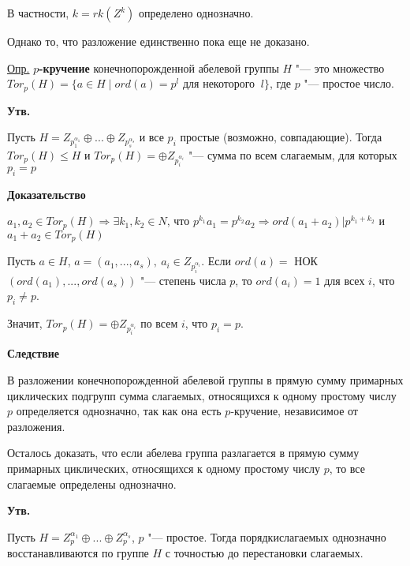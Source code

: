\documentclass{article}
\begin{document}
В частности, $k = rk(Z^k)$ определено однозначно.

Однако то, что разложение единственно пока еще не доказано.

\vspace{5pt}

\underline{Опр.} \textbf{$p$-кручение} конечнопорожденной абелевой группы $H$ "--- это множество $Tor_p(H) = \{a \in H \mid ord(a) = p^l$ для некоторого $\ l\}$, где $p$ "--- простое число.

\vspace{5pt}

\textbf{Утв.}

Пусть $H = Z_{p_1^{\alpha_1}} \oplus ... \oplus Z_{p_s^{\alpha_s}}$ и все $p_i$ простые (возможно, совпадающие). Тогда $Tor_p(H) \leq H$ и $Tor_p(H) = \oplus Z_{p_i^{\alpha_i}}$ "--- сумма по всем слагаемым, для которых $p_i = p$

\vspace{5pt}

\textbf{Доказательство}

$a_1, a_2 \in Tor_p(H) \Rightarrow \exists k_1, k_2 \in N$, что $p^{k_1}a_1 = p^{k_2}a_2 \Rightarrow ord(a_1 + a_2) | p^{k_1 + k_2}$ и $a_1 + a_2 \in Tor_p(H)$

Пусть $a \in H$, $a = (a_1, ..., a_s),\ a_i \in 	Z_{p_i^{\alpha_i}}$. Если $ord(a) = $ НОК$(ord(a_1), ..., ord(a_s))$ "--- степень числа $p$, то $ord(a_i) = 1$ для всех $i$, что $p_i \neq p$.

Значит, $Tor_p(H) = \oplus Z_{p_i^{\alpha_i}}$ по всем $i$, что $p_i = p$.

\vspace{10pt}

\textbf{Следствие}

В разложении конечнопорожденной абелевой группы в прямую сумму примарных циклических подгрупп сумма слагаемых, относящихся к одному простому числу $p$ определяется однозначно, так как она есть $p$-кручение, независимое от разложения.

Осталось доказать, что если абелева группа разлагается в прямую сумму примарных циклических, относящихся к одному простому числу $p$, то все слагаемые определены однозначно.

\vspace{5pt}

\textbf{Утв.}

Пусть $H = Z_p^{\alpha_1} \oplus ... \oplus Z_p^{\alpha_s}$, $p$ "--- простое. Тогда порядкислагаемых однозначно восстанавливаются по группе $H$ с точностью до перестановки слагаемых.
\end{document}
